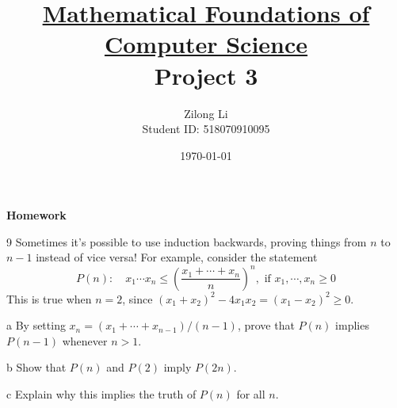 \documentclass[a4paper,12pt]{article}
\title{\small \underline{Mathematical Foundations of Computer Science}\\\Large Project 3}
\author{Zilong Li\\\small Student ID: 518070910095}
\date{\today}
\makeatletter
\newtheorem*{solution}{Solution}
\theoremstyle{definition}
\renewenvironment{solution}[1][Solution] {\par\pushQED{\qed}\normalfont\topsep6\p@\@plus6\p@\relax\trivlist\item[\hskip\labelsep\bfseries#1\@addpunct{.}]\ignorespaces}{\popQED\endtrivlist\@endpefalse} \makeatother
\newenvironment{problems}{\begin{list}{}{\renewcommand{\makelabel}[1]{\textbf{##1}\hfil}}}{\end{list}}
\newenvironment{steps}{\begin{list}{}{\renewcommand{\makelabel}[1]{\textbf{##1}\hfil}}}{\end{list}}
\makeatother
\begin{document}
\maketitle

\noindent\textbf{Homework}

\begin{problems}
    \item[9] Sometimes it's possible to use induction backwards, proving things from
    $n$ to $n - 1$ instead of vice versa! For example, consider the statement
    \begin{equation*}
        P(n):\quad x_1\cdots x_n \leq \left(\frac{x_1+\cdots+x_n}{n}\right)^n, \text{ if } x_1,\cdots,x_n\geq 0
    \end{equation*}
    This is true when $n=2$, since $(x_1+x_2)^2-4x_1x_2=(x_1-x_2)^2\geq 0$.
        \begin{steps}
            \item[a] By setting $x_n = (x_1+\cdots+x_{n-1})/(n - 1)$, prove that $P(n)$ implies
            $P(n - 1)$ whenever $n > 1$.
            \item[b] Show that $P(n)$ and $P(2)$ imply $P(2n)$.
            \item[c] Explain why this implies the truth of $P(n)$ for all $n$. 
        \end{steps}
    \begin{solution}


\end{solution}
\end{problems}
\end{document}
